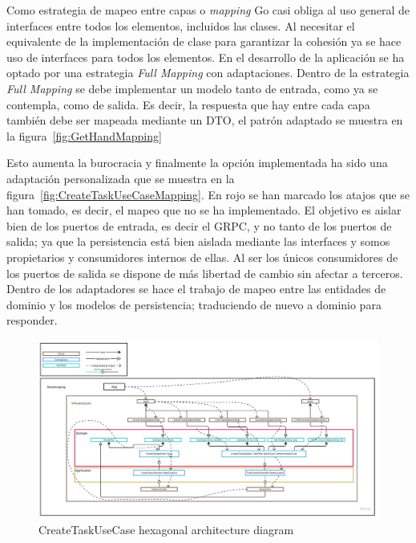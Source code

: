 Como estrategia de mapeo entre capas o \textit{mapping} Go casi obliga al uso general de interfaces entre todos los elementos, incluidos las clases.
Al necesitar el equivalente de la implementación de clase para garantizar la cohesión ya se hace uso de  interfaces para todos los elementos.
En el desarrollo de la aplicación se ha optado por una estrategia \textit{Full Mapping} con adaptaciones.
Dentro de la estrategia \textit{Full Mapping} se debe implementar un modelo tanto de entrada, como ya se contempla, como de salida.
Es decir, la respuesta que hay entre cada capa también debe ser mapeada mediante un DTO, el patrón adaptado se muestra en la figura~\cref{fig:GetHandMapping}

Esto aumenta la burocracia y finalmente la opción implementada ha sido una adaptación personalizada que se muestra en la figura~\cref{fig:CreateTaskUseCaseMapping}.
En rojo se han marcado los atajos que se han tomado, es decir, el mapeo que no se ha implementado.
El objetivo es aislar bien de los puertos de entrada, es decir el GRPC, y no tanto de los puertos de salida;
ya que la persistencia está bien aislada mediante las interfaces y somos propietarios y consumidores internos de ellas.
Al ser los únicos consumidores de los puertos de salida se dispone de más libertad de cambio sin afectar a terceros.
Dentro de los adaptadores se hace el trabajo de mapeo entre las entidades de dominio y los modelos de persistencia; traduciendo de nuevo a dominio para responder.

\begin{figure}[H]
    \centering
    \includegraphics[angle=90,height=1\textheight]{./part/Ejecucion/Seguimiento/CreateTaskUseCase/img/createTaskUseCaseArchitecture}
    \caption{CreateTaskUseCase hexagonal architecture diagram}\label{fig:createTaskUseCaseArchitecture}
\end{figure}

